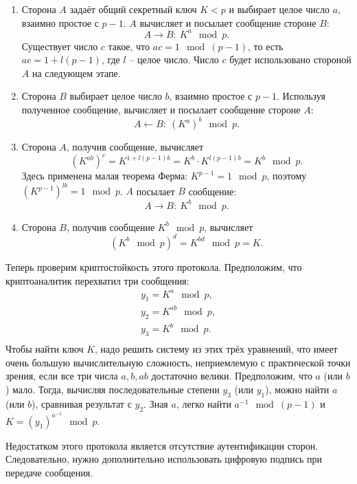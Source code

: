 \begin{enumerate}
    \item Сторона $A$ задаёт общий секретный ключ $K <p$ и выбирает целое число $a$, взаимно простое с $p-1$. $A$ вычисляет и посылает сообщение стороне $B$:
            \[ A \rightarrow B: ~ K^a \mod p. \]
        Существует число $c$ такое, что $a c =1 \mod (p-1)$, то есть $a c = 1 + l (p-1)$, где $l$ -- целое число. Число $c$ будет использовано стороной $A$ на следующем этапе.
    \item Сторона $B$ выбирает целое число $b$, взаимно простое с $p-1$. Используя полученное сообщение, вычисляет и посылает сообщение стороне $A$:
            \[ A \leftarrow B: ~ (K^a)^b \mod p. \]
    \item Сторона $A$, получив сообщение, вычисляет
        \[ \left( K^{ab} \right)^c = K^{1 + l (p-1) b} = K^b \cdot K^{l (p-1) b} = K^b \mod p. \]
        Здесь применена малая теорема Ферма: $K^{p-1} = 1 \mod p$, поэтому $\left( K^{p-1} \right)^{lb} = 1 \mod p$.
        $A$ посылает $B$ сообщение:
            \[ A \rightarrow B: ~ K^b \mod p. \]
    \item Сторона $B$, получив сообщение $K^{b}\mod p$, вычисляет
        \[ (K^b \mod p)^d = K^{bd} \mod p = K. \]
\end{enumerate}

Теперь проверим криптостойкость этого протокола. Предположим, что криптоаналитик перехватил три сообщения:
\[ \begin{array}{l}
    y_1 = K^a \mod p, \\
    y_2 = K^{ab} \mod p, \\
    y_3 = K^b \mod p. \\
\end{array} \]
Чтобы найти ключ $K$, надо решить систему из этих трёх уравнений, что имеет очень большую вычислительную сложность, неприемлемую с практической точки зрения, если все три числа $a, b, ab$ достаточно велики. Предположим, что $a$ (или $b$) мало. Тогда, вычисляя последовательные степени $y_3$ (или $y_1$), можно найти $a$ (или $b$), сравнивая результат с $y_2$. Зная $a$, легко найти $a^{-1}\mod(p-1)$ и $K=(y_1)^{a^{-1}}\mod p$.

Недостатком этого протокола является отсутствие аутентификации сторон. Следовательно, нужно дополнительно использовать цифровую подпись при передаче сообщения.
